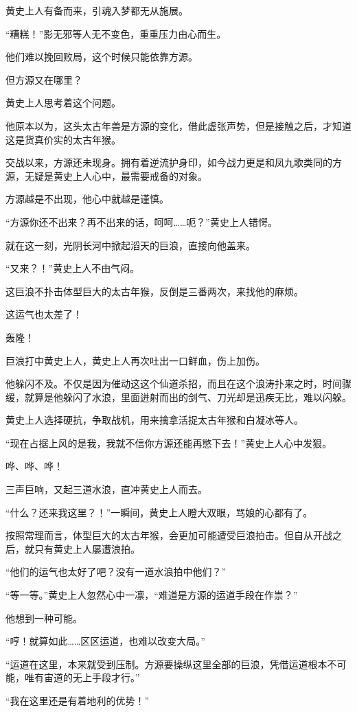 \begin{this_body}
黄史上人有备而来，引魂入梦都无从施展。

“糟糕！”影无邪等人无不变色，重重压力由心而生。

他们难以挽回败局，这个时候只能依靠方源。

但方源又在哪里？

黄史上人思考着这个问题。

他原本以为，这头太古年兽是方源的变化，借此虚张声势，但是接触之后，才知道这是货真价实的太古年猴。

交战以来，方源还未现身。拥有着逆流护身印，如今战力更是和凤九歌类同的方源，无疑是黄史上人心中，最需要戒备的对象。

方源越是不出现，他心中就越是谨慎。

“方源你还不出来？再不出来的话，呵呵……呃？”黄史上人错愕。

就在这一刻，光阴长河中掀起滔天的巨浪，直接向他盖来。

“又来？！”黄史上人不由气闷。

这巨浪不扑击体型巨大的太古年猴，反倒是三番两次，来找他的麻烦。

这运气也太差了！

轰隆！

巨浪打中黄史上人，黄史上人再次吐出一口鲜血，伤上加伤。

他躲闪不及。不仅是因为催动这这个仙道杀招，而且在这个浪涛扑来之时，时间骤缓，就算是他躲闪了水浪，里面迸射而出的剑气、刀光却是迅疾无比，难以闪躲。

黄史上人选择硬抗，争取战机，用来擒拿活捉太古年猴和白凝冰等人。

“现在占据上风的是我，我就不信你方源还能再憋下去！”黄史上人心中发狠。

哗、哗、哗！

三声巨响，又起三道水浪，直冲黄史上人而去。

“什么？还来我这里？！”一瞬间，黄史上人瞪大双眼，骂娘的心都有了。

按照常理而言，体型巨大的太古年猴，会更加可能遭受巨浪拍击。但自从开战之后，就只有黄史上人屡遭浪拍。

“他们的运气也太好了吧？没有一道水浪拍中他们？”

“等一等。”黄史上人忽然心中一凛，“难道是方源的运道手段在作祟？”

他想到一种可能。

“哼！就算如此……区区运道，也难以改变大局。”

“运道在这里，本来就受到压制。方源要操纵这里全部的巨浪，凭借运道根本不可能，唯有宙道的无上手段才行。”

“我在这里还是有着地利的优势！”


\end{this_body}

